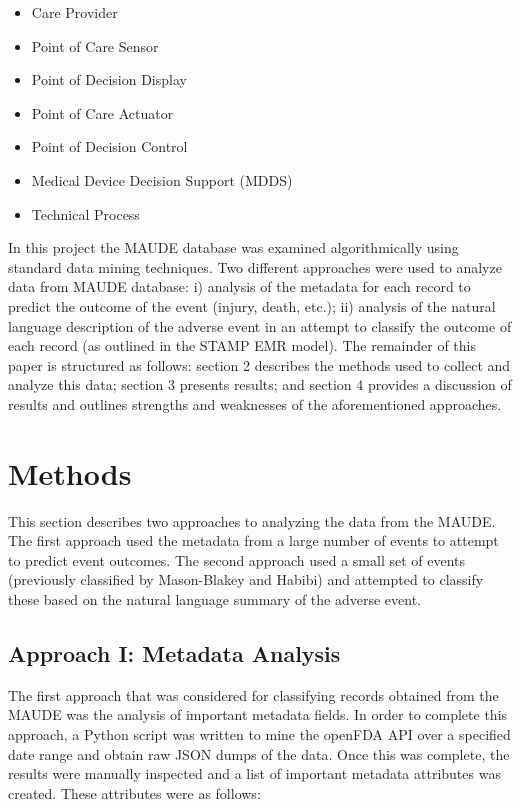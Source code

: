 \documentclass[11pt, notitlepage,abstracton,oneside]{article}   	%
\begin{document}
\begin{itemize}
	\item Care Provider
	\item Point of Care Sensor
	\item Point of Decision Display
	\item Point of Care Actuator
	\item Point of Decision Control
	\item Medical Device Decision Support (MDDS)
	\item Technical Process
\end{itemize}

In this project the MAUDE database was examined algorithmically using standard data mining techniques. Two different approaches were used to analyze data from MAUDE database:  i) analysis of the metadata for each record to predict the outcome of the event (injury, death, etc.); ii) analysis of the natural language description of the adverse event in an attempt to classify the outcome of each record (as outlined in the STAMP EMR model). The remainder of this paper is structured as follows: section 2 describes the methods used to collect and analyze this data; section 3 presents results; and section 4 provides a discussion of results and outlines strengths and weaknesses of the aforementioned approaches. 

\section{Methods}
This section describes two approaches to analyzing the data from the MAUDE. The first approach used the metadata from a large number of events to attempt to predict event outcomes. The second approach used a small set of events (previously classified by Mason-Blakey and Habibi) and attempted to classify these based on the natural language summary of the adverse event.

\subsection{Approach I: Metadata Analysis}
The first approach that was considered for classifying records obtained from the MAUDE was the analysis of important metadata fields. In order to complete this approach, a Python script was written to mine the openFDA API over a specified date range and obtain raw JSON dumps of the data. Once this was complete, the results were manually inspected and a list of important metadata attributes was created. These attributes were as follows:
\end{document}

